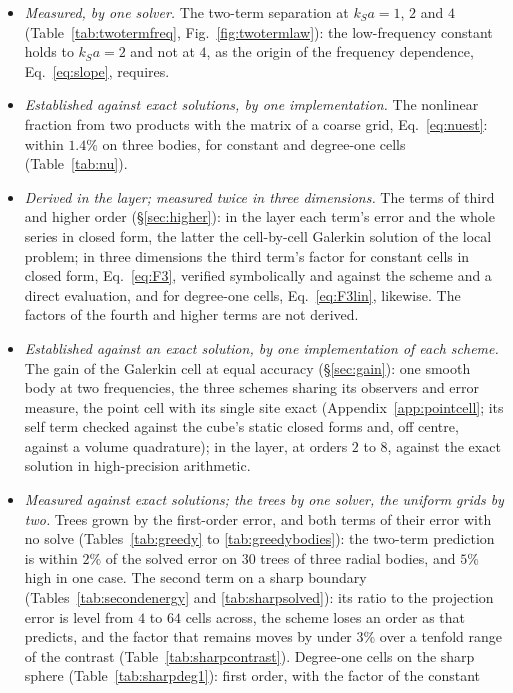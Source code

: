\documentclass[11pt,a4paper]{article}
\begin{document}
\begin{itemize}
\item \emph{Measured, by one solver.} The two-term separation at $k_Sa=1$, $2$ and $4$
(Table~\ref{tab:twotermfreq}, Fig.~\ref{fig:twotermlaw}): the low-frequency constant holds to $k_Sa=2$
and not at $4$, as the origin of the frequency dependence, Eq.~\eqref{eq:slope}, requires.
\item \emph{Established against exact solutions, by one implementation.} The nonlinear fraction from
two products with the matrix of a coarse grid, Eq.~\eqref{eq:nuest}: within $1.4\%$ on three bodies,
for constant and degree-one cells (Table~\ref{tab:nu}).
\item \emph{Derived in the layer; measured twice in three dimensions.} The terms of third and higher
order (\S\ref{sec:higher}): in the layer each term's error and the whole series in closed form, the
latter the cell-by-cell Galerkin solution of the local problem; in three dimensions the third term's
factor for constant cells in closed form, Eq.~\eqref{eq:F3}, verified symbolically and against the
scheme and a direct evaluation, and for degree-one cells, Eq.~\eqref{eq:F3lin}, likewise. The factors of the
fourth and higher terms are not derived.
\item \emph{Established against an exact solution, by one implementation of each scheme.} The gain of
the Galerkin cell at equal accuracy (\S\ref{sec:gain}): one smooth body at two frequencies, the three
schemes sharing its observers and error measure, the point cell with its single site exact
(Appendix~\ref{app:pointcell}; its self term checked against the cube's static closed forms and, off
centre, against a volume quadrature); in the layer, at orders $2$ to $8$, against the exact solution in
high-precision arithmetic.
\item \emph{Measured against exact solutions; the trees by one solver, the uniform grids by two.}
Trees grown by the first-order error, and both terms of their error with no solve
(Tables~\ref{tab:greedy} to \ref{tab:greedybodies}): the two-term prediction is within $2\%$ of the
solved error on $30$ trees of three radial bodies, and $5\%$ high in one case. The second term on a
sharp boundary (Tables~\ref{tab:secondenergy} and \ref{tab:sharpsolved}): its ratio to the projection
error is level from $4$ to $64$ cells across, the scheme loses an order as that predicts, and the
factor that remains moves by under $3\%$ over a tenfold range of the contrast
(Table~\ref{tab:sharpcontrast}). Degree-one
cells on the sharp sphere (Table~\ref{tab:sharpdeg1}): first order, with the factor of the constant

\end{itemize}
\end{document}
